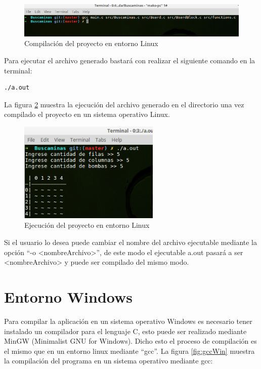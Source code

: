 \documentclass[letterpaper,12pt]{report}
\begin{document}
\begin{figure}[H]
    \centering
    \includegraphics[width=1\textwidth]{gccLinux.png}
    \caption{Compilación del proyecto en entorno Linux}
    \label{fig:gccLinux}
\end{figure}

Para ejecutar el archivo generado bastará con realizar el siguiente comando en la terminal:

\begin{lstlisting}[language=bash]
./a.out
\end{lstlisting}

La figura \ref{fig:ejecLinux} muestra la ejecución del archivo generado en el directorio una vez compilado el proyecto en un sistema operativo Linux.

\begin{figure}[H]
    \centering
    \includegraphics[width=0.6\textwidth]{ejecLinux.png}
    \caption{Ejecución del proyecto en entorno Linux}
    \label{fig:ejecLinux}
\end{figure}

Si el usuario lo desea puede cambiar el nombre del archivo ejecutable mediante la opción ``-o <nombreArchivo>'', de este modo el ejecutable a.out pasará a ser <nombreArchivo> y puede ser compilado del mismo modo.

\section {Entorno Windows}

Para compilar la aplicación en un sistema operativo Windows es necesario tener instalado un compilador para el lenguaje C, esto puede ser realizado mediante MinGW (Minimalist GNU for Windows). Dicho esto el proceso de compilación es el mismo que en un entorno linux mediante ``gcc''. La figura \ref{fig:gccWin} muestra la compilación del programa en un sistema operativo mediante gcc:
\end{document}
